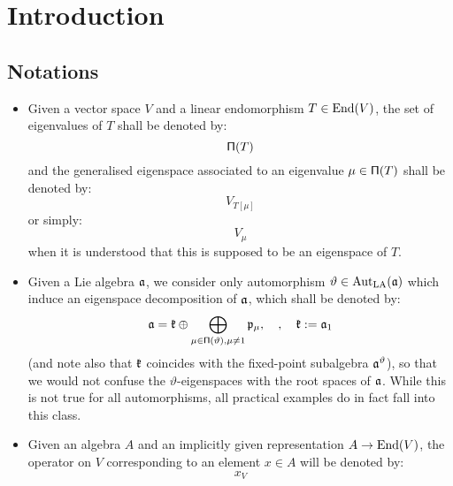 \section{Introduction}
    \subsection{Notations}
        \begin{convention}[Endomorphisms] \label{conv: endomorphisms}
            \begin{itemize}
                \item Given a vector space $V$ and a linear endomorphism $T \in \operatorname{End}(V)$, the set of eigenvalues of $T$ shall be denoted by:
                    $$\mathsf{\Pi}(T)$$
                and the generalised eigenspace associated to an eigenvalue $\mu \in \mathsf{\Pi}(T)$ shall be denoted by:
                    $$V_{T[\mu]}$$
                or simply:
                    $$V_{\mu}$$
                when it is understood that this is supposed to be an eigenspace of $T$.
                \item Given a Lie algebra $\mathfrak{a}$, we consider only automorphism $\vartheta \in \operatorname{Aut}_{\mathrm{LA}}(\mathfrak{a})$ which induce an eigenspace decomposition of $\mathfrak{a}$, which shall be denoted by:
                    $$\mathfrak{a} = \mathfrak{k} \oplus \bigoplus_{ \mu \in \mathsf{\Pi}(\vartheta), \mu \not = 1 } \mathfrak{p}_{\mu}, \quad, \quad \mathfrak{k} := \mathfrak{a}_1$$
                (and note also that $\mathfrak{k}$ coincides with the fixed-point subalgebra $\mathfrak{a}^{\vartheta}$), so that we would not confuse the $\vartheta$-eigenspaces with the root spaces of $\mathfrak{a}$. While this is not true for all automorphisms, all practical examples do in fact fall into this class.
                \item Given an algebra $A$ and an implicitly given representation $A \to \operatorname{End}(V)$, the operator on $V$ corresponding to an element $x \in A$ will be denoted by:
                    $$x_V$$
            \end{itemize}
        \end{convention}

